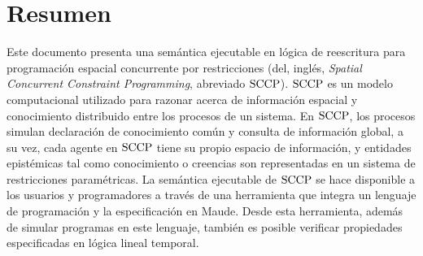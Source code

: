
\chapter*{Resumen}

Este documento presenta una sem\'antica ejecutable en l\'ogica de reescritura para programaci\'on espacial concurrente por restricciones (del, ingl\'es, \textit{Spatial Concurrent Constraint Programming}, abreviado $\textnormal{SCCP}$). $\textnormal{SCCP}$ es un modelo computacional utilizado para razonar acerca de informaci\'on espacial y conocimiento distribuido entre los procesos de un sistema. En $\textnormal{SCCP}$, los procesos simulan declaraci\'on de conocimiento com\'un  y consulta de informaci\'on global, a su vez, cada agente en $\textnormal{SCCP}$ tiene su propio espacio de informaci\'on, y entidades epist\'emicas tal como conocimiento o creencias son representadas en un sistema de restricciones param\'etricas. La sem\'antica ejecutable de $\textnormal{SCCP}$ se hace disponible a los usuarios y programadores a trav\'es de una herramienta que integra un lenguaje de programaci\'on y la especificaci\'on en Maude. Desde esta herramienta, adem\'as de simular programas en este lenguaje, tambi\'en es posible verificar propiedades especificadas en l\'ogica lineal temporal.